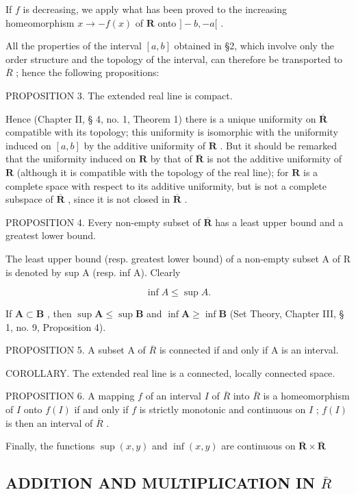 If \(f\) is decreasing, we apply what has been proved to the increasing homeomorphism \(x \to -f(x)\) of \(\mathbf{R}\) onto \(] - b, - a[\) .

All the properties of the interval \([a, b]\) obtained in §2, which involve only the order structure and the topology of the interval, can therefore be transported to \(\overline{R}\) ; hence the following propositions:

PROPOSITION 3. The extended real line is compact.

Hence (Chapter II, § 4, no. 1, Theorem 1) there is a unique uniformity on \(\overline{\mathbf{R}}\) compatible with its topology; this uniformity is isomorphic with the uniformity induced on \([a, b]\) by the additive uniformity of \(\mathbf{R}\) . But it should be remarked that the uniformity induced on \(\mathbf{R}\) by that of \(\overline{\mathbf{R}}\) is not the additive uniformity of \(\mathbf{R}\) (although it is compatible with the topology of the real line); for \(\mathbf{R}\) is a complete space with respect to its additive uniformity, but is not a complete subspace of \(\overline{\mathbf{R}}\) , since it is not closed in \(\overline{\mathbf{R}}\) .

PROPOSITION 4. Every non-empty subset of \(\overline{\mathbf{R}}\) has a least upper bound and a greatest lower bound.

The least upper bound (resp. greatest lower bound) of a non-empty subset A of R is denoted by sup A (resp. inf A). Clearly

\[
\inf A \leqslant \sup A.\tag{1}
\]

If \(\mathbf{A} \subset \mathbf{B}\) , then \(\sup \mathbf{A} \leqslant \sup \mathbf{B}\) and \(\inf \mathbf{A} \geqslant \inf \mathbf{B}\) (Set Theory, Chapter III, § 1, no. 9, Proposition 4).

PROPOSITION 5. A subset A of \(\overline{R}\) is connected if and only if A is an interval.

COROLLARY. The extended real line is a connected, locally connected space.

PROPOSITION 6. A mapping \(f\) of an interval \(I\) of \(\overline{R}\) into \(\overline{R}\) is a homeomorphism of \(I\) onto \(f(I)\) if and only if \(f\) is strictly monotonic and continuous on \(I\) ; \(f(I)\) is then an interval of \(\overline{R}\) .

Finally, the functions \(\sup (x,y)\) and \(\inf (x,y)\) are continuous on \(\overline{\mathbf{R}}\times \overline{\mathbf{R}}\)

\subsection{\texorpdfstring{ADDITION AND MULTIPLICATION IN \(\bar{R}\)}{ADDITION AND MULTIPLICATION IN \textbackslash bar\{R\}}}

